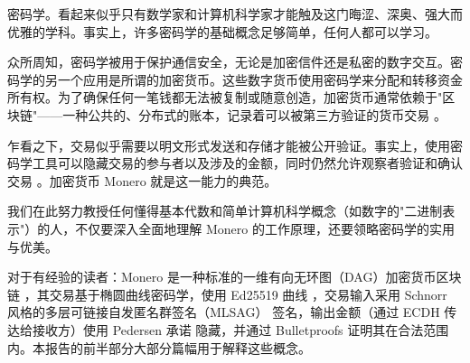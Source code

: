 

密码学。看起来似乎只有数学家和计算机科学家才能触及这门晦涩、深奥、强大而优雅的学科。事实上，许多密码学的基础概念足够简单，任何人都可以学习。
\par
众所周知，密码学被用于保护通信安全，无论是加密信件还是私密的数字交互。密码学的另一个应用是所谓的加密货币。这些数字货币使用密码学来分配和转移资金所有权。为了确保任何一笔钱都无法被复制或随意创造，加密货币通常依赖于"区块链"——一种公共的、分布式的账本，记录着可以被第三方验证的货币交易 \cite{Nakamoto_bitcoin}。
\par
乍看之下，交易似乎需要以明文形式发送和存储才能被公开验证。事实上，使用密码学工具可以隐藏交易的参与者以及涉及的金额，同时仍然允许观察者验证和确认交易 \cite{cryptoNoteWhitePaper}。加密货币 Monero 就是这一能力的典范。
\par
我们在此努力教授任何懂得基本代数和简单计算机科学概念（如数字的"二进制表示"）的人，不仅要深入全面地理解 Monero 的工作原理，还要领略密码学的实用与优美。
\par
对于有经验的读者：Monero 是一种标准的一维有向无环图（DAG）加密货币区块链 \cite{Nakamoto_bitcoin}，其交易基于椭圆曲线密码学，使用 Ed25519 曲线 \cite{Bernstein2008}，交易输入采用 Schnorr 风格的多层可链接自发匿名群签名（MLSAG）\cite{MRL-0005-ringct} 签名，输出金额（通过 ECDH \cite{Diffie-Hellman} 传达给接收方）使用 Pedersen 承诺 \cite{maxwell-ct} 隐藏，并通过 Bulletproofs \cite{Bulletproofs_paper} 证明其在合法范围内。本报告的前半部分大部分篇幅用于解释这些概念。
